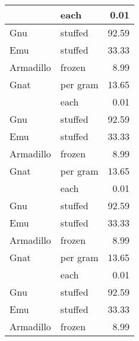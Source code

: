 {\begin{longtable}[l]{|l|l|r|}
\hline
\rowcolor{latextbl!25}          & each     & 0.01  \\
\hline
\rowcolor{latextbl!10}Gnu       & stuffed  & 92.59 \\
\hline
\rowcolor{latextbl!25}Emu       & stuffed  & 33.33 \\
\hline
\rowcolor{latextbl!10}Armadillo & frozen   & 8.99  \\
\hline
\rowcolor{latextbl!25}Gnat      & per gram & 13.65 \\
\hline
\rowcolor{latextbl!10}          & each     & 0.01  \\
\hline
\rowcolor{latextbl!25}Gnu       & stuffed  & 92.59 \\
\hline
\rowcolor{latextbl!10}Emu       & stuffed  & 33.33 \\
\hline
\rowcolor{latextbl!25}Armadillo & frozen   & 8.99  \\
\hline
\rowcolor{latextbl!10}Gnat      & per gram & 13.65 \\
\hline
\rowcolor{latextbl!25}          & each     & 0.01  \\
\hline
\rowcolor{latextbl!10}Gnu       & stuffed  & 92.59 \\
\hline
\rowcolor{latextbl!25}Emu       & stuffed  & 33.33 \\
\hline
\rowcolor{latextbl!10}Armadillo & frozen   & 8.99  \\
\hline
\rowcolor{latextbl!25}Gnat      & per gram & 13.65 \\
\hline
\rowcolor{latextbl!10}          & each     & 0.01  \\
\hline
\rowcolor{latextbl!25}Gnu       & stuffed  & 92.59 \\
\hline
\rowcolor{latextbl!10}Emu       & stuffed  & 33.33 \\
\hline
\rowcolor{latextbl!25}Armadillo & frozen   & 8.99  \\
\hline
\end{longtable}
}
